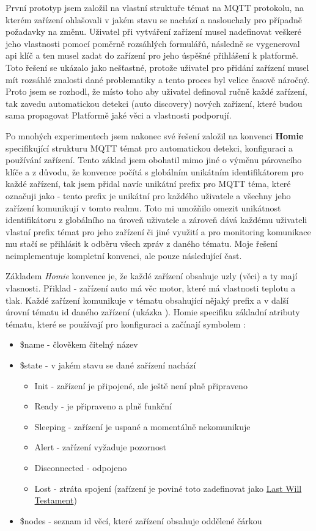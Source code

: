 První prototyp jsem založil na vlastní struktuře témat na MQTT protokolu, na kterém zařízení ohlašovali v jakém stavu se nachází a naslouchaly pro případně požadavky na změnu. Uživatel při vytváření zařízení musel nadefinovat veškeré jeho vlastnosti pomocí poměrně rozsáhlých formulářů, následně se vygeneroval api klíč a ten musel zadat do zařízení pro jeho úspěšné přihlášení k platformě. Toto řešení se ukázalo jako nešťastné, protože uživatel pro přidání zařízení musel mít rozsáhlé znalosti dané problematiky a tento proces byl velice časově náročný. Proto jsem se rozhodl, že místo toho aby uživatel definoval ručně každé zařízení, tak zavedu automatickou detekci (auto discovery) nových zařízení, které budou sama propagovat Platformě jaké věci a vlastnosti podporují.

Po mnohých experimentech jsem nakonec své řešení založil na konvenci \textbf{Homie} \cite{homie} specifikující strukturu MQTT témat pro automatickou detekci, konfiguraci a používání zařízení. Tento základ jsem obohatil mimo jiné o výměnu párovacího klíče a z důvodu, že konvence počítá s globálním unikátním identifikátorem pro každé zařízení, tak jsem přidal navíc unikátní prefix pro MQTT téma, které označuji jako  - tento prefix je unikátní pro každého uživatele a všechny jeho zařízení komunikují v tomto realmu. Toto mi umožňilo omezit unikátnost identifikátoru z globálního na úroveň uživatele a zároveň dává každému uživateli vlastní prefix témat pro jeho zařízení či jiné využití a pro monitoring komunikace mu stačí se přihlásit k odběru všech zpráv z daného tématu. Moje řešení neimplementuje kompletní konvenci, ale pouze následující čast.

Základem \textit{Homie} konvence je, že každé zařízení obsahuje uzly (věci) a ty mají vlasnosti. Přiklad - zařízení auto má věc motor, které má vlastnosti teplotu a tlak. Každé zařízení komunikuje v tématu obsahující nějaký prefix a v další úrovní tématu id daného zařízení (ukázka ). Homie specifiku základní atributy tématu, které se používají pro konfiguraci a začínají symbolem \uv{\$}:
\begin{itemize}
    \item \$name - člověkem čitelný název
    \item \$state - v jakém stavu se dané zařízení nachází
          \begin{itemize}
              \item  Init - zařízení je připojené, ale ještě není plně připraveno
              \item Ready - je připraveno a plně funkční
              \item Sleeping - zařízení je uspané a momentálně nekomunikuje
              \item  Alert - zařízení vyžaduje pozornost
              \item Disconnected - odpojeno
              \item Lost - ztráta spojení (zařízení je poviné toto zadefinovat jako \hyperlink{LWT}{Last Will Testament})
          \end{itemize}
    \item \$nodes - seznam id věcí, které zařízení obsahuje oddělené čárkou
\end{itemize}

